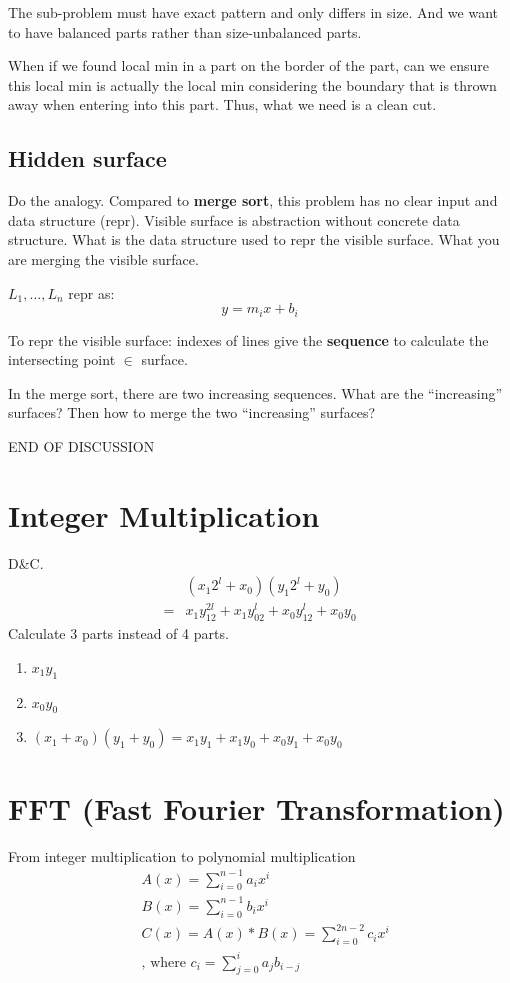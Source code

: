 \documentclass[a4paper]{report}
\theoremstyle{definition}
\begin{document}
The sub-problem must have exact pattern and only differs in size. And we want to have balanced parts rather than size-unbalanced parts.

When if we found local min in a part on the border of the part, can we ensure this local min is actually the local min considering the boundary that is thrown away when entering into this part. Thus, what we need is a clean cut.

\subsection*{Hidden surface}
Do the analogy.
Compared to \textbf{merge sort}, this problem has no clear input and data structure (repr). Visible surface is abstraction without concrete data structure. What is the data structure used to repr the visible surface. What you are merging the visible surface.

$L_1, ..., L_n$ repr as:
$$
y=m_ix+b_i
$$

To repr the visible surface: indexes of lines give the \textbf{sequence} to calculate the intersecting point $\in$ surface.

In the merge sort, there are two increasing sequences. What are  the ``increasing'' surfaces? Then how to merge the two ``increasing'' surfaces?

END OF DISCUSSION

\section{Integer Multiplication}
D\&C.
\begin{align*}
& (x_1 2^l+x_0)(y_1 2^l+y_0)  \\
=& x_1y_12^{2l}+x_1y_02^l+x_0y_12^l+x_0y_0
\end{align*}
Calculate 3 parts instead of 4 parts.
\begin{enumerate}
\item $x_1y_1$
\item $x_0y_0$
\item $(x_1+x_0)(y_1+y_0)=x_1y_1+x_1y_0+x_0y_1+x_0y_0$
\end{enumerate}
\section{FFT (Fast Fourier Transformation)}
From integer multiplication to polynomial multiplication
\begin{align*}
& A(x) = \sum_{i=0}^{n-1} {a_i x^i}\\
& B(x) = \sum_{i=0}^{n-1} {b_i x^i}\\
& C(x) = A(x)*B(x) = \sum_{i=0}^{2n-2} {c_i x^i} \\
& \text{, where } c_i = \sum_{j=0}^i {a_j b_{i-j}}
\end{align*}
\end{document}
